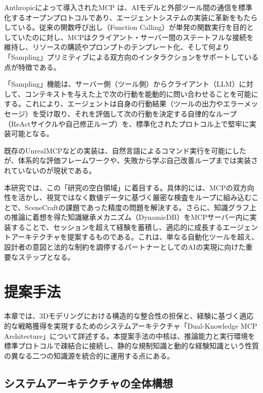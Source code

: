 \documentclass[dvipdfmx, a4paper, 9pt]{deimj}
\begin{document}
Anthropicによって導入されたMCP\cite{anthropic2024mcp} は、AIモデルと外部ツール間の通信を標準化するオープンプロトコルであり、エージェントシステムの実装に革新をもたらしている。従来の関数呼び出し（Function Calling）が単発の関数実行を目的としていたのに対し\cite{schick2024toolformer}、MCPはクライアント・サーバー間のステートフルな接続を維持し、リソースの購読やプロンプトのテンプレート化、そして何より「Sampling」プリミティブによる双方向のインタラクションをサポートしている点が特徴である。

「Sampling」機能は、サーバー側（ツール側）からクライアント（LLM）に対して、コンテキストを与えた上で次の行動を能動的に問い合わせることを可能にする。これにより、エージェントは自身の行動結果（ツールの出力やエラーメッセージ）を受け取り、それを評価して次の行動を決定する自律的なループ（ReActサイクル\cite{yao2023react}や自己修正ループ\cite{shinn2024reflexion,xi2023rise}）を、標準化されたプロトコル上で堅牢に実装可能となる。

既存のUnrealMCP\cite{unrealmcp2024}などの実装は、自然言語によるコマンド実行を可能にしたが、体系的な評価フレームワークや、失敗から学ぶ自己改善ループまでは実装されていないのが現状である。

本研究では、この「研究の空白領域」に着目する。具体的には、MCPの双方向性を活かし、視覚ではなく数値データに基づく厳密な検査をループに組み込むことで、SceneCraftの課題であった精度の問題を解決する。さらに、知識グラフ上の推論に着想を得た知識継承メカニズム（DynamicDB）をMCPサーバー内に実装することで、セッションを超えて経験を蓄積し、適応的に成長するエージェントアーキテクチャを提案するものである。これは、単なる自動化ツールを超え、設計者の意図と法的な制約を調停するパートナーとしてのAIの実現に向けた重要なステップとなる。

\section{提案手法}

本章では、3Dモデリングにおける構造的な整合性の担保と、経験に基づく適応的な戦略獲得を実現するためのシステムアーキテクチャ「Dual-Knowledge MCP Architecture」について詳述する。本提案手法の中核は、推論能力と実行環境を標準プロトコルで疎結合に接続し、静的な規制知識と動的な経験知識という性質の異なる二つの知識源を統合的に運用する点にある。

\subsection{システムアーキテクチャの全体構想}
\end{document}
